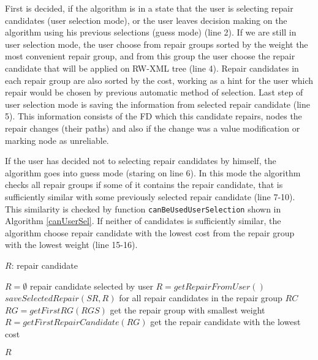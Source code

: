 First is decided, if the algorithm is in a state that the user is selecting repair candidates (user selection mode), or the user leaves decision making on the algorithm using his previous selections (guess mode) (line 2). If we are still in user selection mode, the user choose from repair groups sorted by the weight the most convenient repair group, and from this group the user choose the repair candidate that will be applied on RW-XML tree (line 4). Repair candidates in each repair group are also sorted by the cost, working as a hint for the user which repair would be chosen by previous automatic method of selection. Last step of user selection mode is saving the information from selected repair candidate (line 5). This information consists of the FD which this candidate repairs, nodes the repair changes (their paths) and also if the change was a value modification or marking node as unreliable.

If the user has decided not to selecting repair candidates by himself, the algorithm goes into guess mode (staring on line 6). In this mode the algorithm checks all repair groups if some of it contains the repair candidate, that is sufficiently similar with some previously selected repair candidate (line 7-10). This similarity is checked by function \texttt{canBeUsedUserSelection} shown in Algorithm \ref{canUserSel}. If neither of candidates is sufficiently similar, the algorithm choose repair candidate with the lowest cost from the repair group with the lowest weight (line 15-16).

\begin{algorithm}[H]
\caption{$selectRepairByUser(RGS, SR, t)$}
\label{selectUser}
\begin{algorithmic}[1]
\ENSURE $R$: repair candidate

\STATE $R = \emptyset$
    \STATE \COMMENT repair candidate selected by user
    \STATE $R = getRepairFromUser()$
    \STATE $saveSelectedRepair(SR, R)$
\ELSE
        \STATE \COMMENT for all repair candidates in the repair group
                \RETURN $RC$
            \ENDIF
        \ENDFOR
    \ENDFOR
    \STATE $RG = getFirstRG(RGS)$ \COMMENT get the repair group with smallest weight
    \STATE $R = getFirstRepairCandidate(RG)$ \COMMENT get the repair candidate with the lowest cost
\ENDIF

\RETURN $R$
\end{algorithmic}
\end{algorithm}

